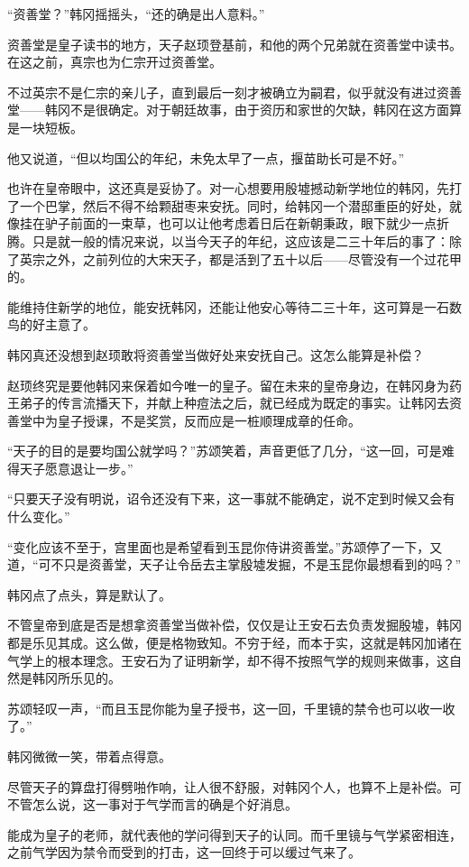 “资善堂？”韩冈摇摇头，“还的确是出人意料。”

资善堂是皇子读书的地方，天子赵顼登基前，和他的两个兄弟就在资善堂中读书。在这之前，真宗也为仁宗开过资善堂。

不过英宗不是仁宗的亲儿子，直到最后一刻才被确立为嗣君，似乎就没有进过资善堂——韩冈不是很确定。对于朝廷故事，由于资历和家世的欠缺，韩冈在这方面算是一块短板。

他又说道，“但以均国公的年纪，未免太早了一点，揠苗助长可是不好。”

也许在皇帝眼中，这还真是妥协了。对一心想要用殷墟撼动新学地位的韩冈，先打了一个巴掌，然后不得不给颗甜枣来安抚。同时，给韩冈一个潜邸重臣的好处，就像挂在驴子前面的一束草，也可以让他考虑着日后在新朝秉政，眼下就少一点折腾。只是就一般的情况来说，以当今天子的年纪，这应该是二三十年后的事了：除了英宗之外，之前列位的大宋天子，都是活到了五十以后——尽管没有一个过花甲的。

能维持住新学的地位，能安抚韩冈，还能让他安心等待二三十年，这可算是一石数鸟的好主意了。

韩冈真还没想到赵顼敢将资善堂当做好处来安抚自己。这怎么能算是补偿？

赵顼终究是要他韩冈来保着如今唯一的皇子。留在未来的皇帝身边，在韩冈身为药王弟子的传言流播天下，并献上种痘法之后，就已经成为既定的事实。让韩冈去资善堂中为皇子授课，不是奖赏，反而应是一桩顺理成章的任命。

“天子的目的是要均国公就学吗？”苏颂笑着，声音更低了几分，“这一回，可是难得天子愿意退让一步。”

“只要天子没有明说，诏令还没有下来，这一事就不能确定，说不定到时候又会有什么变化。”

“变化应该不至于，宫里面也是希望看到玉昆你侍讲资善堂。”苏颂停了一下，又道，“可不只是资善堂，天子让令岳去主掌殷墟发掘，不是玉昆你最想看到的吗？”

韩冈点了点头，算是默认了。

不管皇帝到底是否是想拿资善堂当做补偿，仅仅是让王安石去负责发掘殷墟，韩冈都是乐见其成。这么做，便是格物致知。不穷于经，而本于实，这就是韩冈加诸在气学上的根本理念。王安石为了证明新学，却不得不按照气学的规则来做事，这自然是韩冈所乐见的。

苏颂轻叹一声，“而且玉昆你能为皇子授书，这一回，千里镜的禁令也可以收一收了。”

韩冈微微一笑，带着点得意。

尽管天子的算盘打得劈啪作响，让人很不舒服，对韩冈个人，也算不上是补偿。可不管怎么说，这一事对于气学而言的确是个好消息。

能成为皇子的老师，就代表他的学问得到天子的认同。而千里镜与气学紧密相连，之前气学因为禁令而受到的打击，这一回终于可以缓过气来了。

